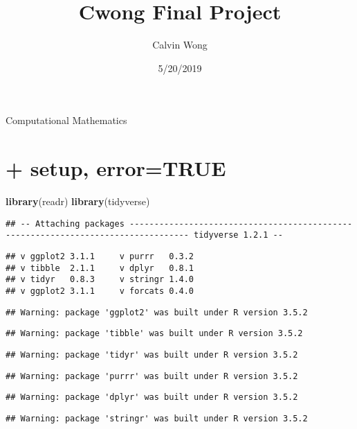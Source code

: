 \documentclass[]{article}
\title{Cwong Final Project}
\author{Calvin Wong}
\date{5/20/2019}
\newenvironment{Shaded}{\begin{snugshade}}{\end{snugshade}}
\newcommand{\KeywordTok}[1]{\textcolor[rgb]{0.13,0.29,0.53}{\textbf{#1}}}
\newcommand{\NormalTok}[1]{#1}
\begin{document}
\maketitle

Computational Mathematics

\section{+ setup, error=TRUE}\label{setup-errortrue}

\begin{Shaded}
\begin{Highlighting}[]
\KeywordTok{library}\NormalTok{(readr)}
\KeywordTok{library}\NormalTok{(tidyverse)}
\end{Highlighting}
\end{Shaded}

\begin{verbatim}
## -- Attaching packages ---------------------------------------------------------------------------------- tidyverse 1.2.1 --
\end{verbatim}

\begin{verbatim}
## v ggplot2 3.1.1     v purrr   0.3.2
## v tibble  2.1.1     v dplyr   0.8.1
## v tidyr   0.8.3     v stringr 1.4.0
## v ggplot2 3.1.1     v forcats 0.4.0
\end{verbatim}

\begin{verbatim}
## Warning: package 'ggplot2' was built under R version 3.5.2
\end{verbatim}

\begin{verbatim}
## Warning: package 'tibble' was built under R version 3.5.2
\end{verbatim}

\begin{verbatim}
## Warning: package 'tidyr' was built under R version 3.5.2
\end{verbatim}

\begin{verbatim}
## Warning: package 'purrr' was built under R version 3.5.2
\end{verbatim}

\begin{verbatim}
## Warning: package 'dplyr' was built under R version 3.5.2
\end{verbatim}

\begin{verbatim}
## Warning: package 'stringr' was built under R version 3.5.2
\end{verbatim}
\end{document}
